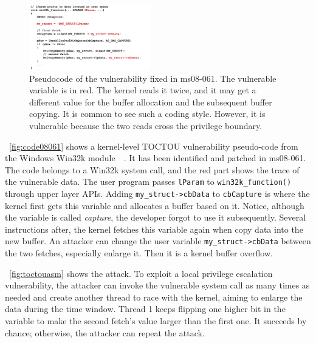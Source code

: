 \begin{figure}[th]
	\includegraphics[width=0.47\textwidth]{figures/code08061}
	\centering
	\caption{Pseudocode of the vulnerability fixed in ms08-061. The vulnerable variable is in red. The kernel reads it twice, and it may get a different value for the buffer allocation and the subsequent buffer copying. It is common to see such a coding style. However, it is vulnerable because the two reads cross the privilege boundary.}
	\label{fig:code08061}
\end{figure}




~\autoref{fig:code08061} shows a kernel-level TOCTOU vulnerability pseudo-code from the Windows Win32k module~\cite{jurczyk2013identifying}~\cite{ms08061}. It has been identified and patched in ms08-061. The code belongs to a Win32k system call, and the red part shows the trace of the vulnerable data.  The user program passes \texttt{lParam} to \texttt{win32k\_function()} through upper layer APIs.  Adding \texttt{my\_struct->cbData} to \texttt{cbCapture} is where the kernel first gets this variable and allocates a buffer based on it. Notice, although the variable is called \textit{capture}, the developer forgot to use it subsequently.  Several instructions after, the kernel fetches this variable again when copy data into the new buffer.  An attacker can change the user variable \texttt{my\_struct->cbData} between the two fetches, especially enlarge it. Then it is a kernel buffer overflow.


~\autoref{fig:toctouasm} shows the attack.  To exploit a local privilege escalation vulnerability, the attacker can invoke the vulnerable system call as many times as needed and create another thread to race with the kernel, aiming to enlarge the data during the time window. Thread 1 keeps flipping one higher bit in the variable to make the second fetch's value larger than the first one. It succeeds by chance; otherwise, the attacker can repeat the attack.


